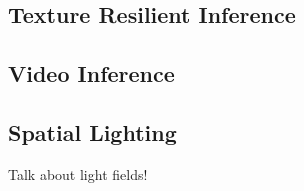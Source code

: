 \documentclass[ %
                    author={Gavin Parker},
                supervisor={Dr. Neill Campbell},
                    degree={MEng},
                     title={Deep Siamese Networks for Illumination Estimation from Stereo Images},
                  subtitle={},
                      type={research},
                      year={2018} ]{dissertation}
\begin{document}
\subsection{Texture Resilient Inference}
\subsection{Video Inference}
\subsection{Spatial Lighting}
Talk about light fields!



%
%
\end{document}
